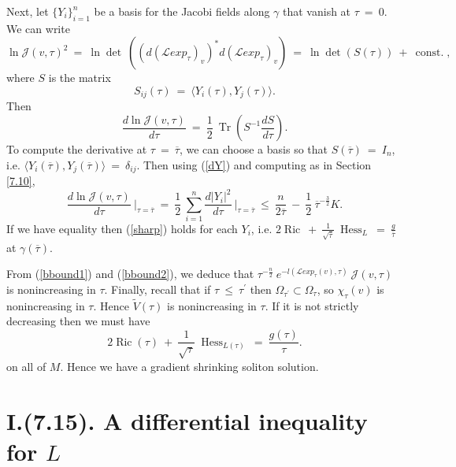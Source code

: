 \documentclass[12pt]{amsart}
\newcommand{\const}{\operatorname{const.}}
\newcommand{\Hess}{\operatorname{Hess}}
\newcommand{\Ric}{\operatorname{Ric}}
\newcommand{\Tr}{\operatorname{Tr}}
\numberwithin{equation}{section}
\theoremstyle{plain}
\theoremstyle{definition}
\theoremstyle{remark}
\begin{document}
Next, let 
$\{Y_i\}_{i=1}^n$ be a basis for the Jacobi fields along $\gamma$
that vanish at $\tau \: =\: 0$.
We can write
\begin{equation}
\ln {\mathcal J}(v, \tau)^2 \: = \:
\ln \det \: \left( \left( d\left( {\mathcal L}exp_\tau \right)_v \right)^*
d\left( {\mathcal L}exp_\tau \right)_v \right) \: = \: \ln \det(S(\tau))
\: + \: \const, 
\end{equation}
where $S$ is the matrix
\begin{equation}
S_{ij}(\tau) \: = \: \langle Y_i(\tau), Y_j(\tau) \rangle.
\end{equation}
Then
\begin{equation}
\frac{d\ln {\mathcal J}(v, \tau)}{d\tau} \: = \: \frac12 \: 
\Tr \left( S^{-1} \frac{dS}{d\tau} \right).
\end{equation}
To compute the derivative at $\tau \: = \: \overline{\tau}$, we can choose
a basis so that $S(\overline{\tau}) \: = \: I_n$, i.e.
$\langle Y_i(\overline{\tau}), Y_j(\overline{\tau}) \rangle
\: = \: \delta_{ij}$.
Then using (\ref{dY}) and computing as in Section \ref{7.10},
\begin{equation} \label{bbound2}
\frac{d\ln {\mathcal J}(v, \tau)}{d\tau} 
\: \Big|_{\tau = \overline{\tau}}
\: = \: \frac12 \: \sum_{i=1}^n
\frac{d|Y_i|^2}{d\tau} \: \Big|_{\tau = \overline{\tau}}
\: \le \: \frac{n}{2\overline{\tau}} \: - \:
\frac{1}{2} \: \overline{\tau}^{-\frac32} K.
\end{equation}
If we have equality then (\ref{sharp}) holds for each
$Y_i$, i.e. $2 \Ric \: + \: \frac{1}{\sqrt{\overline{\tau}}} \:
\Hess_L \: =\: \frac{g}{\overline{\tau}}$ at $\gamma(\overline{\tau})$.

From (\ref{bbound1}) and (\ref{bbound2}), we deduce that
$\tau^{-\frac{n}{2}} \: 
e^{-l({\mathcal L}exp_\tau(v),\tau)} \: {\mathcal J}(v, \tau)$ is
nonincreasing in $\tau$. 
Finally, recall that if
$\tau \: \le \: \tau^\prime$ then $\Omega_{\tau^\prime} \subset
\Omega_\tau$, so $\chi_\tau(v)$ is nonincreasing in $\tau$. Hence
$\tilde{V}(\tau)$ is nonincreasing in $\tau$. If it is not
strictly decreasing then we must have
\begin{equation}
2 \Ric(\tau) \: + \: \frac{1}{\sqrt{\tau}} \: \Hess_{L(\tau)}
\: = \: \frac{g(\tau)}{\tau}.
\end{equation}
on all of $M$. Hence we have a gradient shrinking soliton solution.

\section{I.(7.15). A differential inequality for $L$} \label{I.(7.15)}
\end{document}
